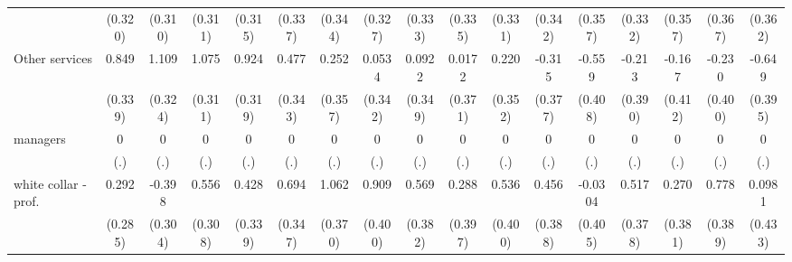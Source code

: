 {\begin{tabular}{l*{16}{c}}
                    &     (0.320)         &     (0.310)         &     (0.311)         &     (0.315)         &     (0.337)         &     (0.344)         &     (0.327)         &     (0.333)         &     (0.335)         &     (0.331)         &     (0.342)         &     (0.357)         &     (0.332)         &     (0.357)         &     (0.367)         &     (0.362)         \\
[1em]
Other services      &       0.849\sym{*}  &       1.109\sym{***}&       1.075\sym{***}&       0.924\sym{**} &       0.477         &       0.252         &      0.0534         &      0.0922         &      0.0172         &       0.220         &      -0.315         &      -0.559         &      -0.213         &      -0.167         &      -0.230         &      -0.649         \\
                    &     (0.339)         &     (0.324)         &     (0.311)         &     (0.319)         &     (0.343)         &     (0.357)         &     (0.342)         &     (0.349)         &     (0.371)         &     (0.352)         &     (0.377)         &     (0.408)         &     (0.390)         &     (0.412)         &     (0.400)         &     (0.395)         \\
[1em]
managers            &           0         &           0         &           0         &           0         &           0         &           0         &           0         &           0         &           0         &           0         &           0         &           0         &           0         &           0         &           0         &           0         \\
                    &         (.)         &         (.)         &         (.)         &         (.)         &         (.)         &         (.)         &         (.)         &         (.)         &         (.)         &         (.)         &         (.)         &         (.)         &         (.)         &         (.)         &         (.)         &         (.)         \\
[1em]
white collar - prof.&       0.292         &      -0.398         &       0.556         &       0.428         &       0.694\sym{*}  &       1.062\sym{**} &       0.909\sym{*}  &       0.569         &       0.288         &       0.536         &       0.456         &     -0.0304         &       0.517         &       0.270         &       0.778\sym{*}  &      0.0981         \\
                    &     (0.285)         &     (0.304)         &     (0.308)         &     (0.339)         &     (0.347)         &     (0.370)         &     (0.400)         &     (0.382)         &     (0.397)         &     (0.400)         &     (0.388)         &     (0.405)         &     (0.378)         &     (0.381)         &     (0.389)         &     (0.433)         \\

\end{tabular}}
